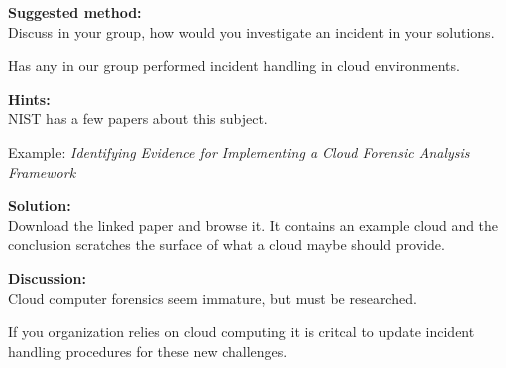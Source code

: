 \documentclass[a4paper,11pt,notitlepage]{report}
\begin{document}
{\bf Suggested method:}\\
Discuss in your group, how would you investigate an incident in your solutions.

Has any in our group performed incident handling in cloud environments.

{\bf Hints:}\\
NIST has a few papers about this subject.

Example:
\emph{Identifying Evidence for Implementing a Cloud Forensic Analysis Framework}

{\bf Solution:}\\
Download the linked paper and browse it. It contains an example cloud and the conclusion scratches the surface of what a cloud maybe should provide.

{\bf Discussion:}\\
Cloud computer forensics seem immature, but must be researched.

If you organization relies on cloud computing it is critcal to update incident handling procedures for these new challenges.
\end{document}
